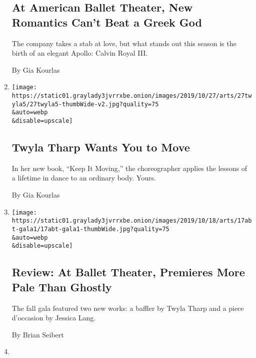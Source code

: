 \begin{enumerate}
  \hypertarget{at-american-ballet-theater-new-romantics-cant-beat-a-greek-god}{%
  \subsection{At American Ballet Theater, New Romantics Can't Beat a
  Greek
  God}\label{at-american-ballet-theater-new-romantics-cant-beat-a-greek-god}}

  The company takes a stab at love, but what stands out this season is
  the birth of an elegant Apollo: Calvin Royal III.

  By Gia Kourlas
\item
  \href{/2019/10/24/arts/dance/twyla-tharp-keep-it-moving-book.html}{}

  \texttt{[image: https://static01.graylady3jvrrxbe.onion/images/2019/10/27/arts/27twyla5/27twyla5-thumbWide-v2.jpg?quality=75\\\&auto=webp\\\&disable=upscale]}

  \hypertarget{twyla-tharp-wants-you-to-move}{%
  \subsection{Twyla Tharp Wants You to
  Move}\label{twyla-tharp-wants-you-to-move}}

  In her new book, ``Keep It Moving,'' the choreographer applies the
  lessons of a lifetime in dance to an ordinary body. Yours.

  By Gia Kourlas
\item
  \href{/2019/10/17/arts/dance/american-ballet-theater-review.html}{}

  \texttt{[image: https://static01.graylady3jvrrxbe.onion/images/2019/10/18/arts/17abt-gala1/17abt-gala1-thumbWide.jpg?quality=75\\\&auto=webp\\\&disable=upscale]}

  \hypertarget{review-at-ballet-theater-premieres-more-pale-than-ghostly}{%
  \subsection{Review: At Ballet Theater, Premieres More Pale Than
  Ghostly}\label{review-at-ballet-theater-premieres-more-pale-than-ghostly}}

  The fall gala featured two new works: a baffler by Twyla Tharp and a
  piece d'occasion by Jessica Lang.

  By Brian Seibert
\item
  \href{/2019/10/17/arts/dance/herman-cornejo-20th-anniversary-abt.html}{}


\end{enumerate}
